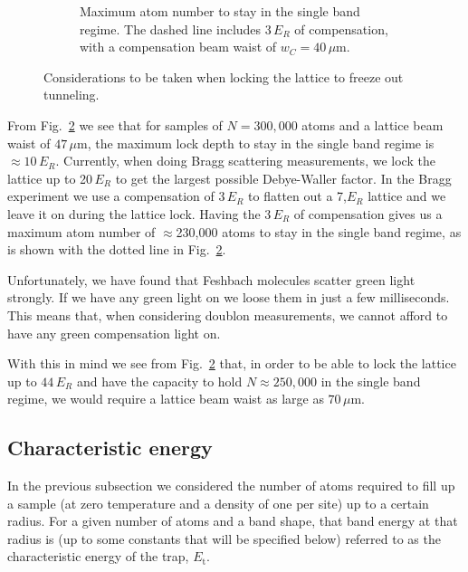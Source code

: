 \documentclass[11pt,letter]{article}
\begin{document}
\begin{figure}
\begin{subfigure}[t]{0.48\textwidth}
\caption{Maximum atom number to stay in the single band regime.  The dashed
line includes 3\,$E_{R}$ of compensation, with a compensation beam waist of
$w_{C}=40\,\mu$m.}
                \label{fig:lattice_lockB}
	\end{subfigure}%
	\caption{Considerations to be taken when locking the lattice to freeze
out tunneling.}\label{fig:lattice_lock}
\end{figure}

From Fig.~\ref{fig:lattice_lock} we see that for samples of $N=300,000$ atoms
and a lattice beam waist of $47\,\mu$m,  the maximum lock depth to stay in the
single band regime is $\approx 10\,E_{R}$.   Currently, when doing Bragg
scattering measurements, we lock the lattice up to 20\,$E_{R}$ to get the
largest possible Debye-Waller factor.   In the Bragg experiment we use a
compensation of 3\,$E_{R}$ to flatten out a 7,$E_{R}$ lattice and we leave it
on during the lattice lock.   Having the $3\,E_{R}$ of compensation gives us a
maximum atom number of $\approx$230,000 atoms to stay in the single band
regime, as is shown with the dotted line in Fig.~\ref{fig:lattice_lock}.

Unfortunately, we have found that Feshbach molecules scatter green light
strongly.  If we have any green light on we loose them in just a few
milliseconds.  This means that, when considering doublon measurements, we
cannot afford to have any green compensation light on.  

With this in mind we see from Fig.~\ref{fig:lattice_lock} that, in order to be
able to lock the lattice up to $44\,E_{R}$  and have the capacity to hold
$N\approx 250,000$ in the single band regime, we would require a lattice beam
waist as large as $70\,\mu$m. 


\subsection{Characteristic energy}

In the previous subsection we considered the number of atoms required to fill
up a sample (at zero temperature and  a density of one per site) up to a
certain radius.    For a given number of atoms and a band shape,  that band
energy at that radius is (up to some constants that will be specified below)
referred to as the characteristic energy of the trap, $E_{\text{t}}$. 


 
\end{document}
